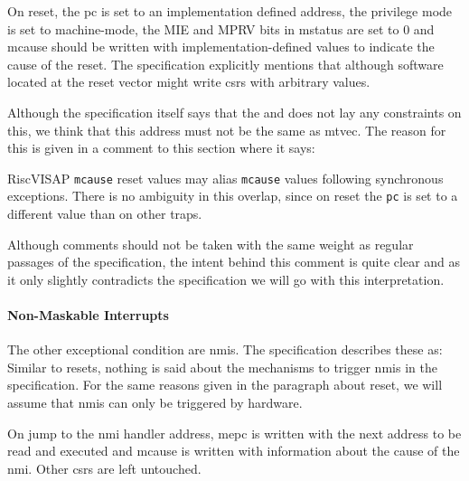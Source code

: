 On reset, the \gls{pc} is set to an implementation defined address, the privilege mode is set to machine-mode, the MIE and MPRV bits in \gls{mstatus} are set to 0 and \gls{mcause} should be written with implementation-defined values to indicate the cause of the reset.
The specification explicitly mentions that  although software located at the reset vector might write \glspl{csr} with arbitrary values.

Although the specification itself says that the  and does not lay any constraints on this, we think that this address must not be the same as \gls{mtvec}.
The reason for this is given in a comment to this section where it says:
\begin{displaycquote}{RiscVISAP}
    \texttt{mcause} reset values may alias \texttt{mcause} values following synchronous exceptions.
    There is no ambiguity in this overlap, since on reset the \texttt{pc} is set to a different value than on other traps.
\end{displaycquote}

Although comments should not be taken with the same weight as regular passages of the specification, the intent behind this comment is quite clear and as it only slightly contradicts the specification we will go with this interpretation.

\paragraph{Non-Maskable Interrupts}
The other exceptional condition are \glspl{nmi}.
The specification describes these as: 
Similar to resets, nothing is said about the mechanisms to trigger \glspl{nmi} in the specification.
For the same reasons given in the paragraph about reset, we will assume that \glspl{nmi} can only be triggered by hardware.

On jump to the \gls{nmi} handler address, \gls{mepc} is written with the next address to be read and executed and \gls{mcause} is written with information about the cause of the \gls{nmi}.
Other \glspl{csr} are left untouched.

